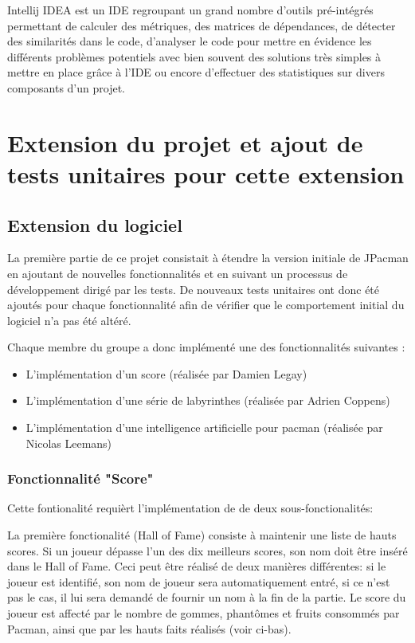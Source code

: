 \documentclass[12pt, openany]{report}
\begin{document}
Intellij IDEA est un IDE regroupant un grand nombre d'outils pré-intégrés permettant de calculer des métriques, des matrices de dépendances, de détecter des similarités dans le code, d'analyser le code pour mettre en évidence les différents problèmes potentiels avec bien souvent des solutions très simples à mettre en place grâce à l'IDE ou encore d'effectuer des statistiques sur divers composants d'un projet.


\section{Extension du projet et ajout de tests unitaires pour cette extension }

\subsection{Extension du logiciel}

La première partie de ce projet consistait à étendre la version initiale de JPacman en ajoutant de nouvelles fonctionnalités et en suivant un processus de développement dirigé par les tests. De nouveaux tests unitaires ont donc été ajoutés pour chaque fonctionnalité afin de vérifier que le comportement initial du logiciel n’a pas été altéré. 

Chaque membre du groupe a donc implémenté une des fonctionnalités suivantes :
\begin{itemize}
\item L'implémentation d'un score (réalisée par Damien Legay)
\item L'implémentation d'une série de labyrinthes (réalisée par Adrien Coppens)
\item L'implémentation d'une intelligence artificielle pour pacman (réalisée par Nicolas Leemans)
\end{itemize}


\subsubsection{Fonctionnalité "Score"}\label{score}
Cette fontionalité requièrt l'implémentation de de deux sous-fonctionalités:

La première fonctionalité (Hall of Fame) consiste à maintenir une liste de hauts scores. Si un joueur dépasse l'un des dix meilleurs scores, son nom doit être inséré dans le Hall of Fame.
Ceci peut être réalisé de deux manières différentes: si le joueur est identifié, son nom de joueur sera automatiquement entré, si ce n'est pas le cas, il lui sera demandé de fournir un nom à la fin de la partie.
Le score du joueur est affecté par le nombre de gommes, phantômes et fruits consommés par Pacman, ainsi que par les hauts faits réalisés (voir ci-bas).
\end{document}
